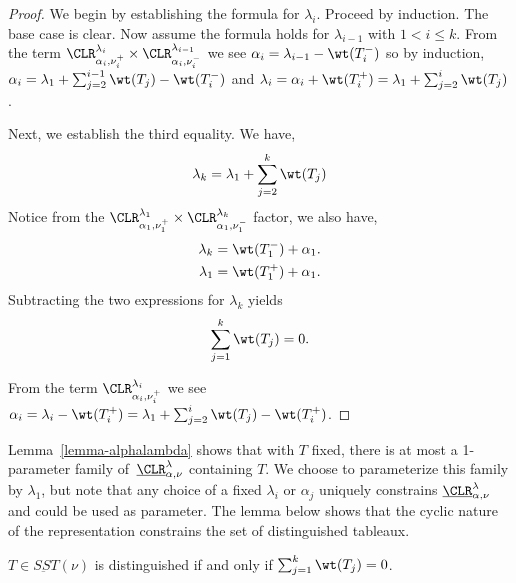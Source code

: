 \begin{proof}
    We begin by establishing the formula for $\lambda_i$. Proceed by induction. The base case is clear. Now assume the formula holds for $\lambda_{i-1}$ with $1 < i \leq k$. From the term $\CLR^{\lambda_i}_{\alpha_i, \nu_i^+} \times \CLR^{\lambda_{i-1}}_{\alpha_i, \nu_i^-}$ we see $\alpha_i = \lambda_{i-1} - \wt(T_i^-)$ so by induction, $\alpha_i = \lambda_1 + \sum_{j=2}^{i-1}\wt(T_j) - \wt(T_i^-)$ and $\lambda_i = \alpha_i + \wt(T_i^+) = \lambda_1 + \sum_{j=2}^i\wt(T_j)$.

    Next, we establish the third equality. We have, 
    $$\lambda_k = \lambda_1 + \sum_{j=2}^{k} \wt(T_j)$$
    Notice from the $ \CLR^{\lambda_1}_{\alpha_1, \nu_1^+} \times \CLR^{\lambda_{k}}_{\alpha_1, \nu_1^-}$ factor, we also have,
    \begin{align*}
    \lambda_k &= \wt(T_1^-) + \alpha_1.\\
    \lambda_1 &= \wt(T_1^+) + \alpha_1.
    \end{align*}
    Subtracting the two expressions for $\lambda_k$ yields
    $$\sum_{j=1}^k \wt(T_j) = 0.$$
    
    From the term $\CLR^{\lambda_i}_{\alpha_i, \nu_i^+}$ we see $\alpha_i = \lambda_i - \wt(T_i^+) = \lambda_1 + \sum_{j=2}^{i} \wt(T_j) - \wt(T_i^+)$. 
\end{proof}

Lemma~\ref{lemma-alphalambda} shows that with $T$ fixed, there is at most a 1-parameter family of~$\underbar{\CLR}^\lambda_{\alpha, \nu}$ containing $T$. We choose to parameterize this family by $\lambda_1$, but note that any choice of a fixed $\lambda_i$ or $\alpha_j$ uniquely constrains  $\underbar{\CLR}^\lambda_{\alpha, \nu}$ and could be used as parameter. The lemma below shows that the cyclic nature of the representation constrains the set of distinguished tableaux.

\begin{lemma} \label{lemma-distingchar}
    $T \in \underbar{SST}(\nu)$ is distinguished if and only if $\sum_{j=1}^k \wt(T_j) = 0$.
\end{lemma}

